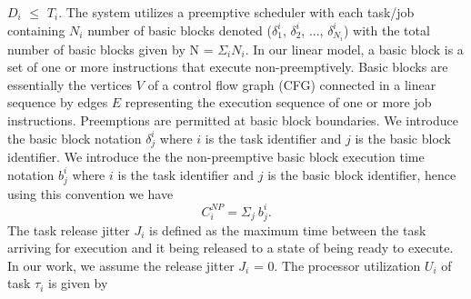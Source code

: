 \begin{math}D_{i}\end{math} \begin{math}\leq\end{math} \begin{math}T_{i}\end{math}.  The system utilizes a preemptive scheduler with each task/job containing \begin{math}N_{i}\end{math} number of basic blocks denoted (\begin{math}\delta_{1}^{i}\end{math}, \begin{math}\delta_{2}^{i}\end{math}, ..., \begin{math}\delta_{N_{i}}^{i}\end{math}) with the total number of basic blocks given by N = \begin{math}\Sigma_{i}\end{math}\begin{math}N_{i}\end{math}. In our linear model, a basic block is a set of one or more instructions that execute non-preemptively.  Basic blocks are essentially the vertices $V$ of a control flow graph (CFG) connected in a linear sequence by edges $E$ representing the execution sequence of one or more job instructions. Preemptions are permitted at basic block boundaries.  We introduce the basic block notation \begin{math}\delta_{j}^{i}\end{math} where $i$ is the task identifier and $j$ is the basic block identifier. We introduce the the non-preemptive basic block execution time notation \begin{math}b_{j}^{i}\end{math} where $i$ is the task identifier and $j$ is the basic block identifier, hence using this convention we have
\begin{equation}\label{eqn:c-np2}
    C_{i}^{NP} = \Sigma_{j}\ b_{j}^{i}.
\end{equation}
\noindent
The task release jitter \begin{math}J_{i}\end{math} is defined as the maximum time between the task arriving for execution and it being released to a state of being ready to execute.  In our work, we assume the release jitter \begin{math}J_{i}\end{math} = 0.  The processor utilization \begin{math}U_{i}\end{math} of task \begin{math}\tau_{i}\end{math} is given by
